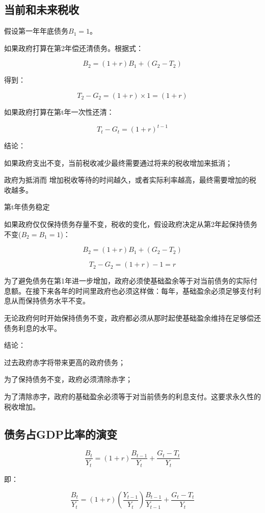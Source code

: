 \documentclass{article}
\begin{document}
\subsection{当前和未来税收}

假设第一年年底债务$ B_1=1 $。

如果政府打算在第2年偿还清债务。根据式：

\[
B_2=(1+r)B_1+(G_2-T_2)
\]

得到：

\[
T_2-G_2=(1+r)\times 1=(1+r)
\]

如果政府打算在第t年一次性还清：

\[
T_t-G_t=(1+r)^{t-1}
\]

结论：

如果政府支出不变，当前税收减少最终需要通过将来的税收增加来抵消；

政府为抵消而 增加税收等待的时间越久，或者实际利率越高，最终需要增加的税收越多。

\hspace*{\fill}

第t年债务稳定

如果政府仅仅保持债务存量不变，税收的变化，假设政府决定从第2年起保持债务不变($ B_2=B_1=1 $)：

\[
B_2=(1+r)B_1+(G_2-T_2)
\]

\[
T_2-G_2=(1+r)-1=r
\]

为了避免债务在第1年进一步增加，政府必须使基础盈余等于对当前债务的实际付息额。在接下来各年的时间里政府也必须这样做：每年，基础盈余必须足够支付利息从而保持债务水平不变。

无论政府何时开始保持债务不变，政府都必须从那时起使基础盈余维持在足够偿还债务利息的水平。

\hspace*{\fill}

结论：

过去政府赤字将带来更高的政府债务；

为了保持债务不变，政府必须清除赤字；

为了清除赤字，政府的基础盈余必须等于对当前债务的利息支付。这要求永久性的税收增加。

\subsection{债务占GDP比率的演变}

\[
\frac{B_t}{Y_t}=(1+r)\frac{B_{t-1}}{Y_t}+\frac{G_t-T_t}{Y_t}
\]

即：

\[
\frac{B_t}{Y_t}=(1+r)(\frac{Y_{t-1}}{Y_t})\frac{B_{t-1}}{Y_{t-1}}+\frac{G_t-T_t}{Y_t}
\]
\end{document}
